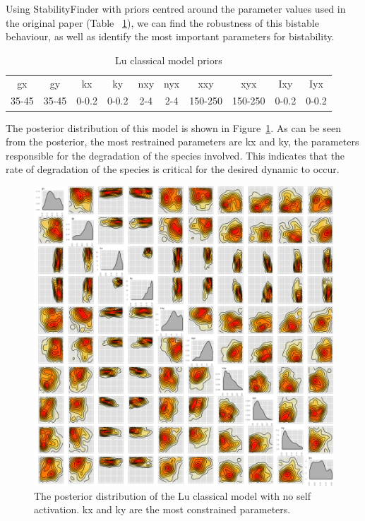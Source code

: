 \clearpage

Using StabilityFinder with priors centred around the parameter values used in the original paper (Table ~\ref{tab:lu}), we can find the robustness of this bistable behaviour, as well as identify the most important parameters for bistability. 
\begin{table}[h]
\centering
\caption{Lu classical model priors}
\label{tab:lu}
\begin{tabular}{cccccccccc}
gx    & gy    & kx    & ky    & nxy & nyx & xxy     & xyx     & Ixy   & Iyx \\
35-45 & 35-45 & 0-0.2 & 0-0.2 & 2-4 & 2-4 & 150-250 & 150-250 & 0-0.2 &   0-0.2 
\end{tabular}
\end{table}

The posterior distribution of this model is shown in Figure~\ref{fig:lu_bistable}. As can be seen from the posterior, the most restrained parameters are kx and ky, the parameters responsible for the degradation of the species involved. This indicates that the rate of degradation of the species is critical for the desired dynamic to occur. 

\begin{figure}[htbp]
\centering
\includegraphics[scale=0.25]{chapterStabilityFinder/Lu_switches/images/classic/posterior_lu_cl.png}
\caption[The posterior distribution of the Lu classical model with no self activation]{The posterior distribution of the Lu classical model with no self activation. kx and ky are the most constrained parameters.}
\label{fig:lu_bistable}
\end{figure}

